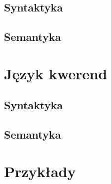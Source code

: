 \documentclass[11pt,a4paper]{article}
\begin{document}
    \subsection{Syntaktyka}
    
    \subsection{Semantyka}
    
    \section{Język kwerend}
    
    \subsection{Syntaktyka}
    
    \subsection{Semantyka}
    
    \section{Przykłady}
    
\end{document}
